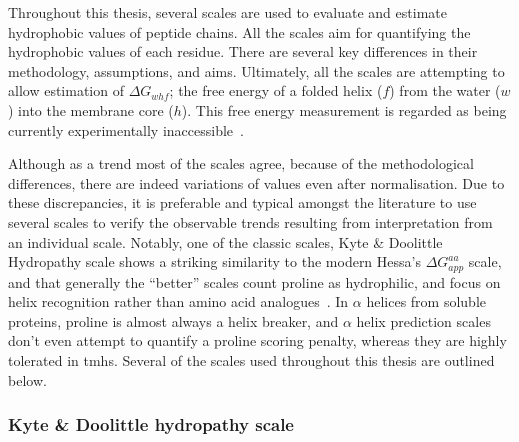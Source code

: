 Throughout this thesis, several scales are used to evaluate and estimate hydrophobic values of peptide chains.
All the scales aim for quantifying the hydrophobic values of each residue.
There are several key differences in their methodology, assumptions, and aims.
Ultimately, all the scales are attempting to allow estimation of ${\Delta G}_{whf}$; the free energy of a folded helix ($ f $) from the water ($w$) into the membrane core ($h$).
This free energy measurement is regarded as being currently experimentally inaccessible~\cite{Cymer2015}.

Although as a trend most of the scales agree, because of the methodological differences, there are indeed variations of values even after normalisation.
Due to these discrepancies, it is preferable and typical amongst the literature to use several scales to verify the observable trends resulting from interpretation from an individual scale.
Notably, one of the classic scales, Kyte \& Doolittle Hydropathy scale shows a striking similarity to the modern Hessa's ${\Delta G}_{app}^{aa}$ scale, and that generally the ``better'' scales count proline as hydrophilic, and focus on helix recognition rather than amino acid analogues~\cite{Peters2014}.
In $\alpha$ helices from soluble proteins, proline is almost always a helix breaker, and $\alpha$ helix prediction scales don't even attempt to quantify a proline scoring penalty, whereas they are highly tolerated in \gls{tmh}s.
Several of the scales used throughout this thesis are outlined below.

\subsubsection{Kyte \& Doolittle hydropathy scale}

